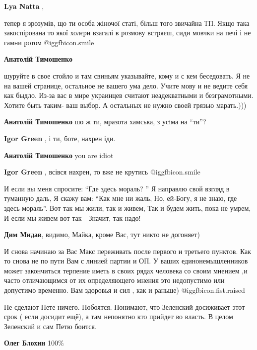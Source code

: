 \begin{itemize}
\begin{itemize}
\textbf{Lya Natta} , 

тепер я зрозумів, що ти особа жіночої статі, більш того звичайна ТП. Якщо така
закоспірована то якої холєри взагалі в розмову встряєш, сиди мовчки на печі і
не гамни ротом  @igg{fbicon.smile} 

\textbf{Анатолій Тимошенко} 

шуруйте в свое стойло и там свиньям указывайте, кому и с кем беседовать. Я не
на вашей странице, остальное не вашего ума дело. Учите мову и не ведите себя
как быдло. Из-за вас в мире украинцев считают неадекватными и безграмотными.
Хотите быть таким- ваш выбор. А остальных не нужно своей грязью марать.)))

\textbf{Анатолій Тимошенко} шо ж ти, мразота хамська, з усiма на \enquote{ти}?

\textbf{Igor Green} , і ти, боте, нахрен іди.

\textbf{Анатолій Тимошенко} you are idiot

\textbf{Igor Green} , всівся нахрен, то вже не крутись  @igg{fbicon.smile} 
\end{itemize} %


\obeycr
И если вы меня спросите: \enquote{Где здесь мораль? }
Я направлю свой взгляд в туманную даль,
Я скажу вам: \enquote{Как мне ни жаль,
Но, ей-Богу, я не знаю, где здесь мораль}.
Вот так мы жили, так и живем,
Так и будем жить, пока не умрем,
И если мы живем вот так -
Значит, так надо!
\restorecr


\textbf{Дим Мидав}, видимо, Майка, кроме Вас, тут никто не догоняет)


И снова начинаю за Вас Макс переживать после первого и третьего пунктов. Как то
снова не по пути Вам с линией партии и ОП. У ваших единонемышленников может
закончиться терпение иметь в своих рядах человека со своим мнением ,и часто
отличающимся от их определяющего мнения это недопустимо или допустимо
временно. Вам здоровья и сил , как и раньше) @igg{fbicon.fist.raised} 


Не сделают Пете ничего. Побоятся. Понимают, что Зеленский досиживает этот срок (
если досидит ещё), а там непонятно кто прийдет во власть. В целом Зеленский и
сам Петю боится.

\textbf{Олег Блохин} 100\%


\end{itemize}
